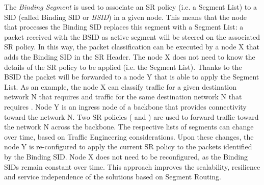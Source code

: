 The \textit{Binding Segment} is used to associate an SR policy (i.e. a Segment List) to a SID (called Binding SID or \textit{BSID}) in a given node. This means that the node that processes the Binding SID replaces this segment with a Segment List: a packet received with the BSID as active segment will be steered on the associated SR policy. In this way, the packet classification can be executed by a node X that adds the Binding SID in the SR Header. The node X does not need to know the details of the SR policy to be applied (i.e. the Segment List). Thanks to the BSID the packet will be forwarded to a node Y that is able to apply the Segment List. As an example, the node X can classify traffic for a given destination network N that requires  and traffic for the same destination network N that requires . Node Y is an ingress node of a backbone that provides connectivity toward the network N. Two SR policies ( and ) are used to forward traffic toward the network N across the backbone. The respective lists of segments can change over time, based on Traffic Engineering considerations. Upon these changes, the node Y is re-configured to apply the current SR policy to the packets identified by the Binding SID. Node X does not need to be reconfigured, as the Binding SIDs remain constant over time. This approach improves the scalability, resilience and service independence of the solutions based on Segment Routing.

